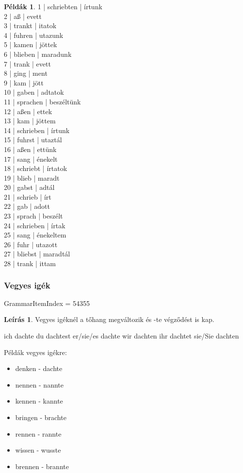 \documentclass{article}
\theoremstyle{definition}
\newtheorem*{exmp}{Példák}
\newtheorem*{desc}{Leírás}
\begin{document}
\begin{exmp}
1 | schriebten | írtunk\\
2 | aß | evett\\
3 | trankt | itatok\\
4 | fuhren | utazunk\\
5 | kamen | jöttek\\
6 | blieben | maradunk\\
7 | trank | evett\\
8 | ging | ment\\
9 | kam | jött\\
10 | gaben | adtatok\\
11 | sprachen | beszéltünk\\
12 | aßen | ettek\\
13 | kam | jöttem\\
14 | schrieben | írtunk\\
15 | fuhrst | utaztál\\
16 | aßen | ettünk\\
17 | sang | énekelt\\
18 | schriebt | írtatok\\
19 | blieb | maradt\\
20 | gabst | adtál\\
21 | schrieb | írt\\
22 | gab | adott\\
23 | sprach | beszélt\\
24 | schrieben | írtak\\
25 | sang | énekeltem\\
26 | fuhr | utazott\\
27 | bliebst | maradtál\\
28 | trank | ittam\\
\end{exmp}

\subsubsection{Vegyes igék}

GrammarItemIndex = 54355

\begin{desc}
Vegyes igéknél a tőhang megváltozik és -te végződést is kap.

ich dachte
du dachtest
er/sie/es dachte
wir dachten
ihr dachtet
sie/Sie dachten

Példák vegyes igékre:
\begin{itemize}
\item denken - dachte
\item nennen - nannte
\item kennen - kannte
\item bringen - brachte
\item rennen - rannte
\item wissen - wusste
\item brennen - brannte
\end{itemize}
\end{desc}
\end{document}
